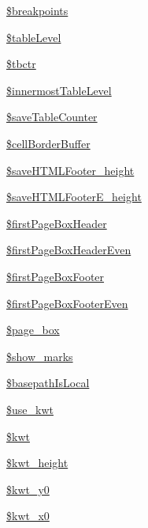 \begin{DoxyCompactItemize}
\item 
\hyperlink{classm_p_d_f_a73e3a12d0f5e0615e48adfc05e7f3c7d}{\$breakpoints}
\item 
\hyperlink{classm_p_d_f_aa8d31708d6bf12860f50f126e5118742}{\$table\-Level}
\item 
\hyperlink{classm_p_d_f_ade264f15ad01c1d402a05877d12de0a6}{\$tbctr}
\item 
\hyperlink{classm_p_d_f_a9d6d18a17137700e73d02bd6006b97d4}{\$innermost\-Table\-Level}
\item 
\hyperlink{classm_p_d_f_aba4237f6ef9519abbac42d6f066827a5}{\$save\-Table\-Counter}
\item 
\hyperlink{classm_p_d_f_a8bbaccbfc5efb3febf4ed8676524d6d4}{\$cell\-Border\-Buffer}
\item 
\hyperlink{classm_p_d_f_ab14094685a53a13f25702ed722d2a544}{\$save\-H\-T\-M\-L\-Footer\-\_\-height}
\item 
\hyperlink{classm_p_d_f_a156184db8adebaee82ccdf09ff2f89e2}{\$save\-H\-T\-M\-L\-Footer\-E\-\_\-height}
\item 
\hyperlink{classm_p_d_f_a84c448e0b64fb50a4ffa83105b03fad2}{\$first\-Page\-Box\-Header}
\item 
\hyperlink{classm_p_d_f_acf3497b02fce3c55667f3863e9a7acfb}{\$first\-Page\-Box\-Header\-Even}
\item 
\hyperlink{classm_p_d_f_a65cd3ad70ccf3e0c403598eb5ed122c9}{\$first\-Page\-Box\-Footer}
\item 
\hyperlink{classm_p_d_f_a051f5d9571ad301acdedb25895dce230}{\$first\-Page\-Box\-Footer\-Even}
\item 
\hyperlink{classm_p_d_f_a3aa82a5bd7ad2c9087458a2ffb10ffcf}{\$page\-\_\-box}
\item 
\hyperlink{classm_p_d_f_aefa8b50397cebb73857358d40fa3c567}{\$show\-\_\-marks}
\item 
\hyperlink{classm_p_d_f_a5f7b1214aa0ade877727f615be30b07a}{\$basepath\-Is\-Local}
\item 
\hyperlink{classm_p_d_f_ab017f6ed4e252bf723479e0fa70660d9}{\$use\-\_\-kwt}
\item 
\hyperlink{classm_p_d_f_af4cf0c5ebcbcb6cf1fb0d4ebb16170c7}{\$kwt}
\item 
\hyperlink{classm_p_d_f_afa152e672f6eacd131f0d00d0b5bdcb4}{\$kwt\-\_\-height}
\item 
\hyperlink{classm_p_d_f_ac297b3200a107c49ad340b594b30acd7}{\$kwt\-\_\-y0}
\item 
\hyperlink{classm_p_d_f_aa6ce440cef3bd5140410df8e6785b10c}{\$kwt\-\_\-x0}
\item 

\end{DoxyCompactItemize}
